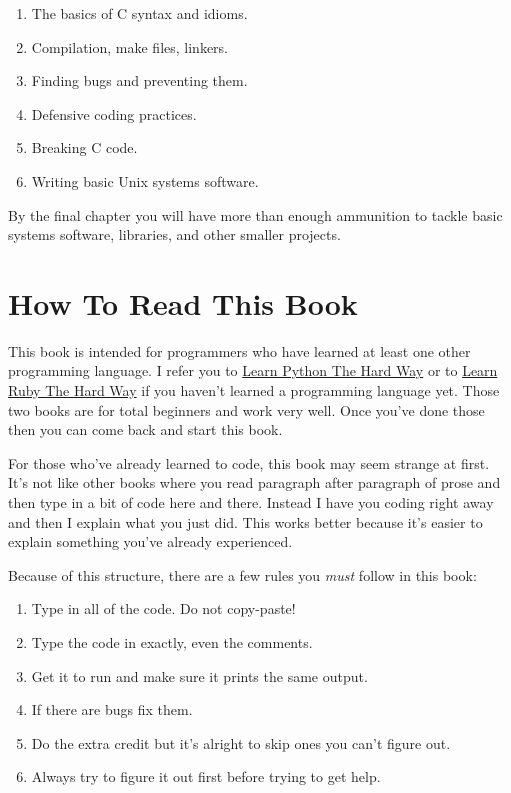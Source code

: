 \begin{enumerate}
\item The basics of C syntax and idioms.
\item Compilation, make files, linkers.
\item Finding bugs and preventing them.
\item Defensive coding practices.
\item Breaking C code.
\item Writing basic Unix systems software.
\end{enumerate}

By the final chapter you will have more than enough ammunition
to tackle basic systems software, libraries, and other smaller
projects.


\section*{How To Read This Book}

This book is intended for programmers who have learned at least one other
programming language.  I refer you to
\href{http://learnpythonthehardway.org}{Learn Python The Hard Way} or to
\href{http://ruby.learncodethehardway.org}{Learn Ruby The Hard Way} if you
haven't learned a programming language yet.  Those two books are for total
beginners and work very well.  Once you've done those then you can come back
and start this book.

For those who've already learned to code, this book may seem strange
at first.  It's not like other books where you read paragraph after
paragraph of prose and then type in a bit of code here and there.  Instead
I have you coding right away and then I explain what you just did.
This works better because it's easier to explain something you've 
already experienced.

Because of this structure, there are a few rules you \emph{must} follow
in this book:

\begin{enumerate}
\item Type in all of the code. Do not copy-paste!
\item Type the code in exactly, even the comments.
\item Get it to run and make sure it prints the same output.
\item If there are bugs fix them.
\item Do the extra credit but it's alright to skip ones you can't figure out.
\item Always try to figure it out first before trying to get help.
\end{enumerate}

